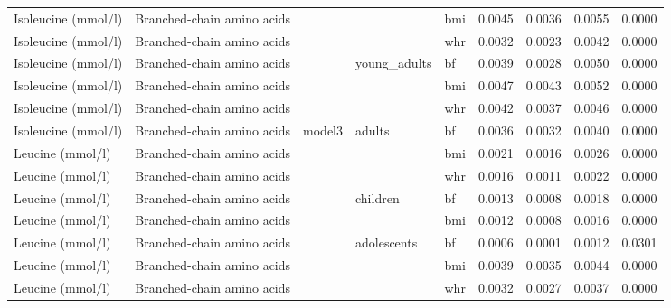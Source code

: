 \documentclass[11pt,twoside]{bristolthesis}
\begin{document}
\begin{longtable}[t]{lllllrrrr}
\cmidrule{1-2}
\cmidrule{4-9}\nopagebreak
Isoleucine (mmol/l) & Branched-chain amino acids &  &  & bmi & 0.0045 & 0.0036 & 0.0055 & 0.0000\\
\cmidrule{1-2}
\cmidrule{5-9}\nopagebreak
Isoleucine (mmol/l) & Branched-chain amino acids &  &  & whr & 0.0032 & 0.0023 & 0.0042 & 0.0000\\
\cmidrule{1-2}
\cmidrule{5-9}\nopagebreak
Isoleucine (mmol/l) & Branched-chain amino acids &  & \multirow{-3}{*}{\raggedright\arraybackslash young\_adults} & bf & 0.0039 & 0.0028 & 0.0050 & 0.0000\\
\cmidrule{1-2}
\cmidrule{4-9}\nopagebreak
Isoleucine (mmol/l) & Branched-chain amino acids &  &  & bmi & 0.0047 & 0.0043 & 0.0052 & 0.0000\\
\cmidrule{1-2}
\cmidrule{5-9}\nopagebreak
Isoleucine (mmol/l) & Branched-chain amino acids &  &  & whr & 0.0042 & 0.0037 & 0.0046 & 0.0000\\
\cmidrule{1-2}
\cmidrule{5-9}\nopagebreak
Isoleucine (mmol/l) & Branched-chain amino acids & \multirow{-8}{*}{\raggedright\arraybackslash model3} & \multirow{-3}{*}{\raggedright\arraybackslash adults} & bf & 0.0036 & 0.0032 & 0.0040 & 0.0000\\
\cmidrule{1-9}\pagebreak[0]
Leucine (mmol/l) & Branched-chain amino acids &  &  & bmi & 0.0021 & 0.0016 & 0.0026 & 0.0000\\
\cmidrule{1-2}
\cmidrule{5-9}\nopagebreak
Leucine (mmol/l) & Branched-chain amino acids &  &  & whr & 0.0016 & 0.0011 & 0.0022 & 0.0000\\
\cmidrule{1-2}
\cmidrule{5-9}\nopagebreak
Leucine (mmol/l) & Branched-chain amino acids &  & \multirow{-3}{*}{\raggedright\arraybackslash children} & bf & 0.0013 & 0.0008 & 0.0018 & 0.0000\\
\cmidrule{1-2}
\cmidrule{4-9}\nopagebreak
Leucine (mmol/l) & Branched-chain amino acids &  &  & bmi & 0.0012 & 0.0008 & 0.0016 & 0.0000\\
\cmidrule{1-2}
\cmidrule{5-9}\nopagebreak
Leucine (mmol/l) & Branched-chain amino acids &  & \multirow{-2}{*}{\raggedright\arraybackslash adolescents} & bf & 0.0006 & 0.0001 & 0.0012 & 0.0301\\
\cmidrule{1-2}
\cmidrule{4-9}\nopagebreak
Leucine (mmol/l) & Branched-chain amino acids &  &  & bmi & 0.0039 & 0.0035 & 0.0044 & 0.0000\\
\cmidrule{1-2}
\cmidrule{5-9}\nopagebreak
Leucine (mmol/l) & Branched-chain amino acids &  &  & whr & 0.0032 & 0.0027 & 0.0037 & 0.0000\\
\cmidrule{1-2}

\end{longtable}
\end{document}
